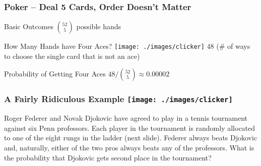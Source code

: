 \begin{frame}

\frametitle{Poker -- Deal 5 Cards, Order Doesn't Matter}

\begin{block}{Basic Outcomes}
\vspace{0.3em} 
$\displaystyle{52 \choose 5}$ possible hands
\end{block}
\begin{block}{How Many Hands have Four Aces? \hfill \texttt{[image: ./images/clicker]} } \pause
\alert{48 (\# of ways to choose the single card that is not an ace)}
\end{block}

\begin{block}{Probability of Getting Four Aces}
\vspace{0.3em} 
$48/\displaystyle{52 \choose 5} \approx 0.00002$
\end{block}


\end{frame}
%
\begin{frame}
\frametitle{A Fairly Ridiculous Example \hfill \texttt{[image: ./images/clicker]}}

Roger Federer and Novak Djokovic have agreed to play in a tennis tournament against six Penn professors. Each player in the tournament is randomly allocated to one of the eight rungs in the ladder (next slide). Federer always beats Djokovic and, naturally, either of the two pros always beats any of the professors. What is the probability that Djokovic gets second place in the tournament? 



\end{frame}

